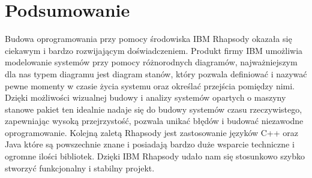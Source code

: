 \documentclass[a4paper,11pt]{article}
\begin{document}
\section{Podsumowanie}
Budowa oprogramowania przy pomocy środowiska IBM Rhapsody 
okazała się ciekawym i bardzo rozwijającym doświadczeniem.
Produkt firmy IBM umożliwia modelowanie systemów przy pomocy różnorodnych diagramów, najważniejszym dla nas
typem diagramu jest diagram stanów, który pozwala definiować i nazywać pewne momenty w czasie życia systemu oraz określać przejścia pomiędzy nimi.
Dzięki możliwości wizualnej budowy i analizy systemów opartych o maszyny stanowe pakiet ten idealnie 
nadaje się do budowy systemów czasu rzeczywistego, zapewniając wysoką przejrzystość, pozwala unikać błędów i budować niezawodne oprogramowanie.
Kolejną zaletą Rhapsody jest zastosowanie 
języków C++ oraz Java które są powszechnie znane i posiadają bardzo 
duże wsparcie techniczne i ogromne ilości bibliotek.
Dzięki IBM Rhapsody udało nam się stosunkowo szybko stworzyć funkcjonalny i stabilny projekt.
\end{document}
